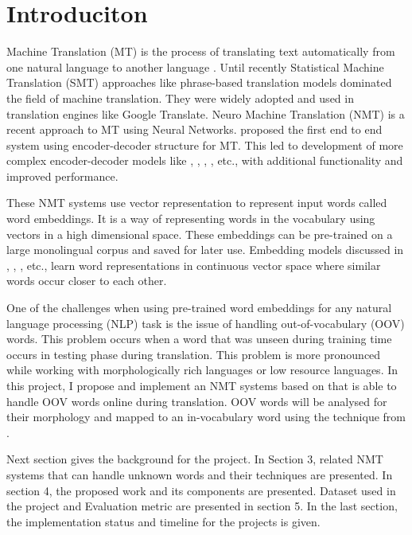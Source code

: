 \section{Introduciton}


Machine Translation (MT) is the process of translating text automatically from one natural language to another  language \citep{russell2002artificial}. Until recently Statistical Machine Translation (SMT) approaches like phrase-based translation models \citep{koehn2003statistical} dominated the field of machine translation. They were widely adopted and used in translation engines like Google Translate. Neuro Machine Translation (NMT) is a recent approach to MT using Neural Networks.  \cite{kalchbrenner2013recurrent} proposed the first end to end system using encoder-decoder structure for MT. This led to development of more complex encoder-decoder models like \cite{graves2013generating}, \cite{kalchbrenner2013recurrent}, \cite{sutskever2014sequence}, \cite{cho2014learning}, etc., with additional functionality and improved performance.

These NMT systems use vector representation to represent input words called word embeddings. It is a way of representing words in the vocabulary using vectors in a high dimensional space. These embeddings can be pre-trained on a large monolingual corpus and saved for later use. Embedding models discussed in  \cite{bengio2003neural}, \cite{mikolov2013distributed}, \cite{pennington2014glove}, etc., learn word representations in continuous vector space where similar words occur closer to each other. 


One of the challenges when using pre-trained word embeddings for any natural language processing (NLP) task is the issue of handling out-of-vocabulary (OOV) words. This problem occurs when a word that was unseen during training time occurs in testing phase during translation. This problem is more pronounced while working with morphologically rich languages or low resource languages. In this project, I propose and implement an NMT systems based on \cite{bahdanau2014neural} that is able to handle OOV words online during translation. OOV words will be analysed for their morphology and mapped to an in-vocabulary word using the technique from \cite{soricut2015unsupervised}.

Next section gives the background for the project. In Section 3, related NMT systems that can handle unknown words and their techniques are presented. In section 4, the proposed work and its components are presented. Dataset used in the project and Evaluation metric are presented in section 5. In the last section, the implementation status and timeline for the projects is given.
%


